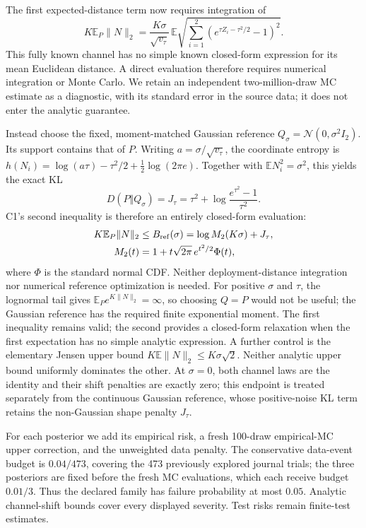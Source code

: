 The first expected-distance term now requires integration of
\begin{equation}
 K\mathbb E_P\|N\|_2=
 \frac{K\sigma}{\sqrt{v_\tau}}\,
 \mathbb E\sqrt{\sum_{i=1}^2(e^{\tau Z_i-\tau^2/2}-1)^2}.
 \label{equ:sim_c1_lognormal_distance}
\end{equation}
This fully known channel has no simple known closed-form expression for
its mean Euclidean distance. A direct evaluation therefore requires
numerical integration or Monte Carlo. We retain an independent two-million-draw
MC estimate as a diagnostic, with its standard error in the source data;
it does not enter the analytic guarantee.

Instead choose the fixed, moment-matched Gaussian reference
$Q_\sigma=\mathcal N(0,\sigma^2 I_2)$. Its support contains that of $P$.
Writing $a=\sigma/\sqrt{v_\tau}$, the coordinate entropy is
$h(N_i)=\log(a\tau)-\tau^2/2+\tfrac12\log(2\pi e)$.
Together with $\mathbb E N_i^2=\sigma^2$, this yields the exact KL
\begin{equation}
 D(P\Vert Q_\sigma)
 =J_\tau=\tau^2+\log\frac{e^{\tau^2}-1}{\tau^2}.
 \label{equ:sim_c1_lognormal_kl}
\end{equation}
C1's second inequality is therefore an entirely closed-form evaluation:
\begin{align}
 K\mathbb E_P\|N\|_2
 &\leq B_{\rm ref}(\sigma)=\log M_2(K\sigma)+J_\tau,\nonumber\\
 M_2(t)&=1+t\sqrt{2\pi}\,e^{t^2/2}\Phi(t),
 \label{equ:sim_c1_reference}
\end{align}
where $\Phi$ is the standard normal CDF. Neither deployment-distance
integration nor numerical reference optimization is needed. For positive
$\sigma$ and $\tau$, the lognormal tail gives
$\mathbb E_P e^{K\|N\|_2}=\infty$, so choosing $Q=P$ would not be useful;
the Gaussian reference has the required finite exponential moment. The first
inequality remains valid; the second provides a closed-form relaxation
when the first expectation has no simple analytic expression.
A further control is the elementary Jensen upper bound
$K\mathbb E\|N\|_2\leq K\sigma\sqrt2$. Neither analytic upper bound
uniformly dominates the other. At $\sigma=0$, both channel laws are the
identity and their shift penalties are exactly zero; this endpoint is
treated separately from the continuous Gaussian reference, whose positive-noise
KL term retains the non-Gaussian shape penalty $J_\tau$.

For each posterior we add its empirical risk, a fresh 100-draw empirical-MC
upper correction, and the unweighted data penalty. The conservative data-event
budget is $0.04/473$, covering the 473 previously explored journal trials;
the three posteriors are fixed before the fresh MC evaluations, which each
receive budget $0.01/3$. Thus the declared family has failure probability
at most $0.05$. Analytic channel-shift bounds cover every displayed severity.
Test risks remain finite-test estimates.

